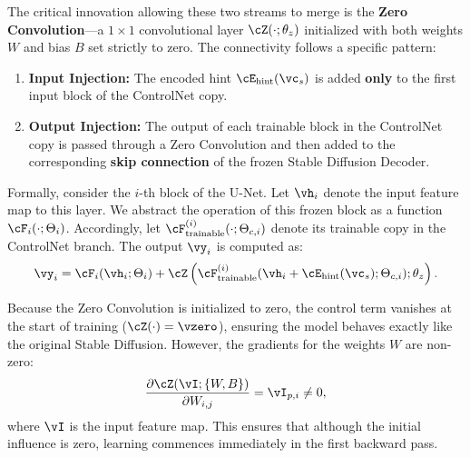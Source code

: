 \documentclass[../../book-main.tex]{subfiles}
\begin{document}
The critical innovation allowing these two streams to merge is the \textbf{Zero Convolution}—a \(1 \times 1\) convolutional layer \(\cZ(\cdot; \theta_{z})\) initialized with both weights \(W\) and bias \(B\) set strictly to zero.
The connectivity follows a specific pattern:
\begin{enumerate}
    \item \textbf{Input Injection:} The encoded hint \(\cE_{\text{hint}}(\vc_{s})\) is added \textbf{only} to the first input block of the ControlNet copy.
    \item \textbf{Output Injection:} The output of each trainable block in the ControlNet copy is passed through a Zero Convolution and then added to the corresponding \textbf{skip connection} of the frozen Stable Diffusion Decoder.
\end{enumerate}

Formally, consider the \(i\)-th block of the U-Net. Let \(\vh_{i}\) denote the input feature map to this layer.
We abstract the operation of this frozen block as a function \(\cF_{i}(\cdot; \Theta_{i})\).
Accordingly, let \(\cF_{\text{trainable}}^{(i)}(\cdot; \Theta_{c,i})\) denote its trainable copy in the ControlNet branch.
The output \(\vy_{i}\) is computed as:
\begin{equation}
    \vy_{i} = \cF_{i}(\vh_{i}; \Theta_{i}) + \cZ\left( \cF_{\text{trainable}}^{(i)}(\vh_{i} + \cE_{\text{hint}}(\vc_{s}); \Theta_{c,i}); \theta_{z} \right) .
\label{eq:controlnet}
\end{equation}

Because the Zero Convolution is initialized to zero, the control term vanishes at the start of training (\(\cZ(\cdot) = \vzero\)), ensuring the model behaves exactly like the original Stable Diffusion.
However, the gradients for the weights \(W\) are non-zero:
\begin{equation}
    \frac{\partial \cZ(\vI; \{W, B\})}{\partial W_{i,j}} = \vI_{p,i} \neq 0 ,
\end{equation}
where \(\vI\) is the input feature map.
This ensures that although the initial influence is zero, learning commences immediately in the first backward pass.
\end{document}
